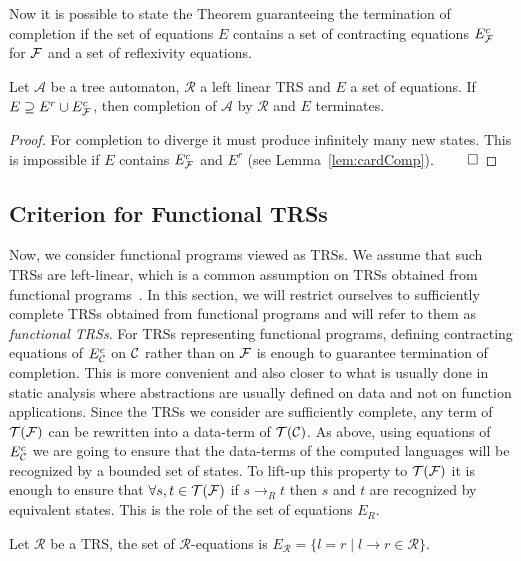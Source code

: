 \documentclass[a4paper,11pt]{llncs}
\newcommand{\A}{\mathcal{A}}
\def \R {\mathcal{R}}
\newcommand{\F}{{\cal F}}
\newcommand{\C}{{\cal C}}
\newcommand{\TF}{{\cal T(F)}}
\newcommand{\TC}{{\cal T(C)}}
\def\ETF{E^{r}}
\def\Ecf{E^c_{\F}}
\def\Ecc{E^c_{\C}}
\newcommand{\rw}{\rightarrow}
\newcommand{\sep}{\; | \;}
\theoremstyle{plain}
\begin{document}
\noindent
Now it is possible to state the Theorem guaranteeing the termination of
completion if the set of equations $E$ contains a set of contracting equations
$\Ecf$ for $\F$ and a set of reflexivity equations. 

\begin{theorem}
\label{th:termFinite}
Let $\A$ be a tree automaton, $\R$ a left linear TRS and $E$ a set of
equations. If $E\supseteq \ETF \cup \Ecf$, then completion of $\A$ by $\R$ and
$E$ terminates.\end{theorem}

\begin{proof}
For completion to diverge it must produce infinitely many new states. This is
impossible if $E$ contains $\Ecf$ and $\ETF$ (see
Lemma~\ref{lem:cardComp}). $\qed$
\end{proof}

\subsection{Criterion for Functional TRSs}
\label{sec:functional}
Now, we consider functional programs viewed as TRSs. We assume that such
TRSs are left-linear, which is a common assumption on TRSs obtained from
functional programs~\cite{BaaderN-book98}. In this section, we will restrict
ourselves to sufficiently complete TRSs obtained from functional programs and
will refer to them as {\em functional TRSs}. For TRSs representing functional programs,  
defining contracting equations of $\Ecc$ on $\C$ rather than
on $\F$ is enough to guarantee termination of completion. This is more convenient and
also closer to what is usually done in static analysis where abstractions are
usually defined on data and not on function applications.
Since the TRSs we consider are sufficiently complete, any term of $\TF$ can be
rewritten into a data-term of $\TC$. As above, using equations of $\Ecc$ we are going to
ensure that the data-terms of the computed languages will be
recognized by a bounded set of states. To lift-up this property to $\TF$ it is
enough to ensure that $\forall s,t \in \TF$ if $s \to_R t$ then $s$
and $t$ are recognized by equivalent states. This is the role of the set of
equations $E_R$.

\begin{definition}[$E_\R$]
Let $\R$ be a TRS, the set of $\R$-equations is $E_\R= \{l=r \sep l \rw r \in \R\}$.
\end{definition}
\end{document}
